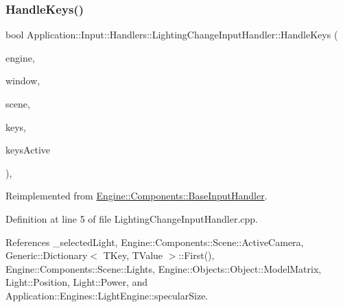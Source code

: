 \subsubsection{\texorpdfstring{Handle\+Keys()}{HandleKeys()}}
{\footnotesize\ttfamily bool Application\+::\+Input\+::\+Handlers\+::\+Lighting\+Change\+Input\+Handler\+::\+Handle\+Keys (\begin{DoxyParamCaption}\item[{\mbox{\hyperlink{classEngine_1_1BaseEngine}{Engine\+::\+Base\+Engine}} $\ast$}]{engine,  }\item[{\mbox{\hyperlink{classEngine_1_1Components_1_1Window}{Engine\+::\+Components\+::\+Window}} $\ast$}]{window,  }\item[{\mbox{\hyperlink{classEngine_1_1Components_1_1Scene}{Engine\+::\+Components\+::\+Scene}} $\ast$}]{scene,  }\item[{\mbox{\hyperlink{classGeneric_1_1Dictionary}{Generic\+::\+Dictionary}}$<$ short, bool $>$ \&}]{keys,  }\item[{int}]{keys\+Active }\end{DoxyParamCaption})\hspace{0.3cm}{\ttfamily [override]}, {\ttfamily [virtual]}}



Reimplemented from \mbox{\hyperlink{classEngine_1_1Components_1_1BaseInputHandler_af7deea3367074324fdbefe48119d40ce}{Engine\+::\+Components\+::\+Base\+Input\+Handler}}.



Definition at line 5 of file Lighting\+Change\+Input\+Handler.\+cpp.



References \+\_\+selected\+Light, Engine\+::\+Components\+::\+Scene\+::\+Active\+Camera, Generic\+::\+Dictionary$<$ T\+Key, T\+Value $>$\+::\+First(), Engine\+::\+Components\+::\+Scene\+::\+Lights, Engine\+::\+Objects\+::\+Object\+::\+Model\+Matrix, Light\+::\+Position, Light\+::\+Power, and Application\+::\+Engines\+::\+Light\+Engine\+::specular\+Size.


